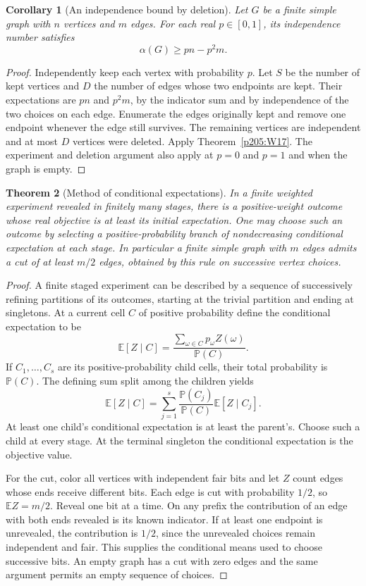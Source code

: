 \documentclass[11pt,oneside,openany]{book}
\theoremstyle{plain}
\newtheorem{theorem}{Theorem}[chapter]
\newtheorem{corollary}[theorem]{Corollary}
\theoremstyle{definition}
\theoremstyle{remark}
\begin{document}
\begin{corollary}[An independence bound by deletion]
\label{p205:W18}
Let \(G\) be a finite simple graph with \(n\) vertices and \(m\) edges.
For each real \(p\in[0,1]\), its independence number satisfies
\[
  \alpha(G)\ge pn-p^2m .
\]
\end{corollary}

\begin{proof}
Independently keep each vertex with probability \(p\). Let \(S\) be
the number of kept vertices and \(D\) the number of edges whose two
endpoints are kept. Their expectations are \(pn\) and \(p^2m\), by
the indicator sum and by independence of the two choices on each
edge. Enumerate the edges originally kept and remove one endpoint
whenever the edge still survives. The remaining vertices are
independent and at most \(D\) vertices were deleted. Apply
Theorem~\ref{p205:W17}. The experiment and deletion argument also
apply at \(p=0\) and \(p=1\) and when the graph is empty.
\end{proof}

\begin{theorem}[Method of conditional expectations]
\label{p205:W19}
In a finite weighted experiment revealed in finitely many stages,
there is a positive-weight outcome whose real objective is at
least its initial expectation. One may choose such an outcome
by selecting a positive-probability branch of nondecreasing
conditional expectation at each stage.
In particular a finite simple graph with \(m\) edges admits a
cut of at least \(m/2\) edges, obtained by this rule on successive
vertex choices.
\end{theorem}

\begin{proof}
A finite staged experiment can be described by a sequence of
successively refining partitions of its outcomes, starting at the
trivial partition and ending at singletons. At a current cell \(C\)
of positive probability define the conditional expectation to be
\[
  \mathbb E[Z\mid C]=
     \frac{\sum_{\omega\in C}p_\omega Z(\omega)}{\mathbb P(C)}.
\]
If \(C_1,\ldots,C_s\) are its positive-probability child cells, their
total probability is \(\mathbb P(C)\). The defining sum split among
the children yields
\[
  \mathbb E[Z\mid C]
     =\sum_{j=1}^{s}\frac{\mathbb P(C_j)}{\mathbb P(C)}
                      \mathbb E[Z\mid C_j].
\]
At least one child's conditional expectation is at least the
parent's. Choose such a child at every stage. At the terminal
singleton the conditional expectation is the objective value.

For the cut, color all vertices with independent fair bits and let
\(Z\) count edges whose ends receive different bits. Each edge is cut
with probability \(1/2\), so \(\mathbb E Z=m/2\). Reveal one bit at a
time. On any prefix the contribution of an edge with both ends
revealed is its known indicator. If at least one endpoint is
unrevealed, the contribution is \(1/2\), since the unrevealed
choices remain independent and fair. This supplies the conditional
means used to choose successive bits. An empty graph has a cut with
zero edges and the same argument permits an empty sequence of choices.
\end{proof}
\end{document}

